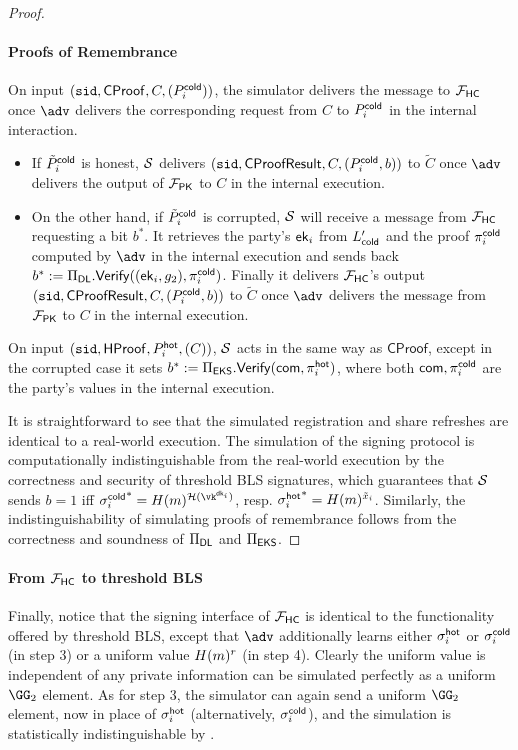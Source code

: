 \begin{proof}
\paragraph{Proofs of Remembrance}
On input $(\texttt{sid}, \mathsf{CProof}, C, (P_i^{\mathsf{cold}}))$, the simulator delivers the message to $\mathcal{F}_\mathsf{HC}$ once $\adv$ delivers the corresponding request from $C$ to $P_i^{\mathsf{cold}}$ in the internal interaction. 
\begin{itemize}
    \item If $\tilde{P}_i^{\mathsf{cold}}$ is honest, $\mathcal{S}$ delivers $(\texttt{sid}, \mathsf{CProofResult}, C,\allowbreak (P_i^{\mathsf{cold}}, b))$ to $\tilde{C}$ once $\adv$ delivers the output of $\mathcal{F}_\mathsf{PK}$ to $C$ in the internal execution. 
    \item On the other hand, if $\tilde{P}_i^{\mathsf{cold}}$ is corrupted, $\mathcal{S}$ will receive a message from $\mathcal{F}_\mathsf{HC}$ requesting a bit $b^*$. It retrieves the party's $\mathsf{ek}_i$ from $L_{\mathsf{cold}}'$ and the proof $\pi_i^{\mathsf{cold}}$ computed by $\adv$ in the internal execution and sends back $b^* := \Pi_{\sf DL}.\mathsf{Verify}((\mathsf{ek}_i,\allowbreak g_2), {\pi_i^{\mathsf{cold}}})$. Finally it delivers $\mathcal{F}_\mathsf{HC}$'s output $(\texttt{sid},\allowbreak \mathsf{CProofResult},\allowbreak C, (P_i^{\mathsf{cold}}, b))$ to $\tilde{C}$ once $\adv$ delivers the message from $\mathcal{F}_\mathsf{PK}$ to $C$ in the internal execution.
\end{itemize}
On input $(\texttt{sid}, \mathsf{HProof}, P_i^{\mathsf{hot}}, (C))$, $\mathcal{S}$ acts in the same way as $\mathsf{CProof}$, except in the corrupted case it sets $b^* := \Pi_{\sf EKS}.\mathsf{Verify}(\mathsf{com}, {\pi_i^{\mathsf{hot}}})$, where both $\mathsf{com}, \pi_i^{\mathsf{cold}}$ are the party's values in the internal execution.

It is straightforward to see that the simulated registration and share refreshes are identical to a real-world execution.
The simulation of the signing protocol is computationally indistinguishable from the real-world execution by the correctness and security of threshold BLS signatures, which guarantees that $\mathcal{S}$ sends $b=1$ iff ${\sigma_i^\cold}^* = \blshash(m)^{\lhlhash(\vk^{\dk_i})}$, resp. ${\sigma_i^{\mathsf{hot}}}^* = H(m)^{\tilde{x}_i}$. 
Similarly, the indistinguishability of simulating proofs of remembrance follows from the correctness and soundness of $\Pi_{\sf DL}$ and $\Pi_{\sf EKS}$.
\end{proof}

\paragraph{From $\mathcal{F}_\mathsf{HC}$ to threshold BLS} 
Finally, notice that the signing interface of $\mathcal{F}_\mathsf{HC}$ is identical to the functionality offered by threshold BLS, except that $\adv$ additionally learns either $\sigma_i^{\mathsf{hot}}$ or $\sigma_i^{\mathsf{cold}}$ (in step 3) or a uniform value $H(m)^r$ (in step 4). Clearly the uniform value is independent of any private information can be simulated perfectly as a uniform $\GG_2$ element. As for step 3, the simulator can again send a uniform $\GG_2$ element, now in place of $\sigma_i^{\mathsf{hot}}$ (alternatively, $\sigma_i^{\mathsf{cold}}$), and the simulation is statistically indistinguishable by .